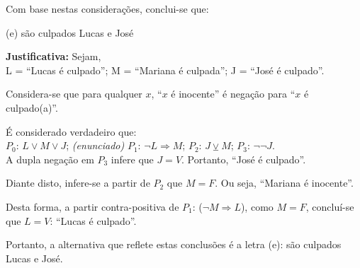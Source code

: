 \documentclass[12pt, a4paper, onecolumn]{exam}
\begin{document}
\begin{questions}
    Com base nestas considerações, conclui-se que: 
    

    \begin{solution}
        (e) são culpados Lucas e José

        \textbf{Justificativa:} Sejam, \\[0.5em]
            L = “Lucas é culpado”;   \hfill
            M = “Mariana é culpada”; \hfill
            J = “José é culpado”.    

        Considera-se que para qualquer \(x\), “\(x\) é inocente” é negação para “\(x\) é culpado(a)”. 

        É considerado verdadeiro que: \\[1em]
        \(P_0\): \( L \vee M \vee J \); \textit{(enunciado)} \hfill
        \(P_1\): \( \neg L \Rightarrow M \); \hfill
        \(P_2\): \( J \veebar M \); \hfill
        \(P_3\): \( \neg \neg J \). \\[1em]
        A dupla negação em \(P_3\) infere que \(J = V\). Portanto, “José é culpado”.

        Diante disto, infere-se a partir de \(P_2\) que \(M = F\). Ou seja, “Mariana é inocente”.

        Desta forma, a partir contra-positiva de \(P_1\): (\( \neg M \Rightarrow L \)), como \(M = F\), concluí-se que \( L = V \): “Lucas é culpado”.
    
        Portanto, a alternativa que reflete estas conclusões é a letra (e): são culpados Lucas e José.
        

\end{solution}
\end{questions}
\end{document}
